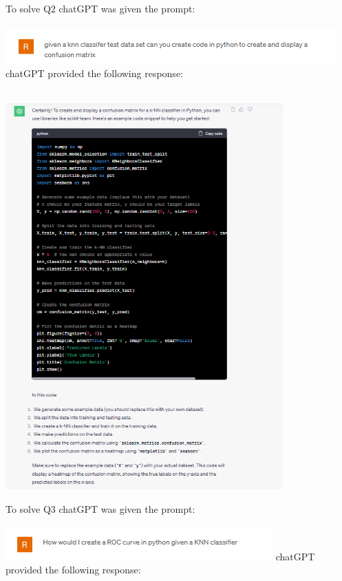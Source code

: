 \documentclass{article}
\begin{document}
\begin{titlepage}
To solve Q2 chatGPT was given the prompt: \\\\
\includegraphics[width=\textwidth]{q2prompt.png}
chatGPT provided the following response: \\\\
\begin{center}
\includegraphics[width=0.8\textwidth]{q2response.png}
\end{center}
To solve Q3 chatGPT was given the prompt: \\\\
\includegraphics[width=\textwidth]{q3prompt.png}
chatGPT provided the following response: \\\\
\begin{center}

\end{center}
\end{titlepage}
\end{document}
